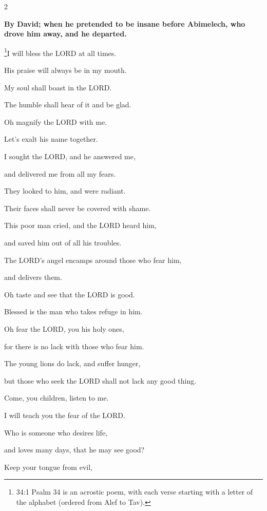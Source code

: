\begin{multicols}{2}
	
	\mychapter{}\textbf{By David; when he pretended to be insane before Abimelech, who drove him away, and he departed.}
	
	\myverse*{}\footnote{34:1 Psalm 34 is an acrostic poem, with each verse starting with a letter of the alphabet (ordered
		from Alef to Tav).}I will bless the LORD at all times.
	
	His praise will always be in my mouth.
	
	
	\myverse{}My soul shall boast in the LORD.
	
	The humble shall hear of it and be glad.
	
	
	\myverse{}Oh magnify the LORD with me.
	
	Let’s exalt his name together.
	
	
	\myverse{}I sought the LORD, and he answered me,
	
	and delivered me from all my fears.
	
	
	\myverse{}They looked to him, and were radiant.
	
	Their faces shall never be covered with shame.
	
	
	\myverse{}This poor man cried, and the LORD heard him,
	
	and saved him out of all his troubles.
	
	
	\myverse{}The LORD’s angel encamps around those who fear him,
	
	and delivers them.
	
	
	\myverse{}Oh taste and see that the LORD is good.
	
	Blessed is the man who takes refuge in him.
	
	
	\myverse{}Oh fear the LORD, you his holy ones,
	
	for there is no lack with those who fear him.
	
	
	\myverse{}The young lions do lack, and suffer hunger,
	
	but those who seek the LORD shall not lack any good thing.
	
	\vspace{\baselineskip}
	
	\myverse{}Come, you children, listen to me.
	
	I will teach you the fear of the LORD.
	
	
	\myverse{}Who is someone who desires life,
	
	and loves many days, that he may see good?
	
	
	\myverse{}Keep your tongue from evil,
	

\end{multicols}
